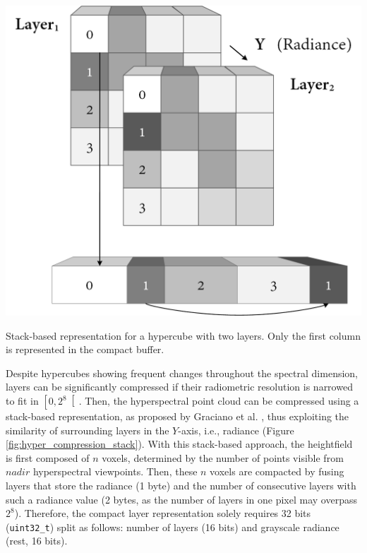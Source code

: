 \begin{marginfigure}[.cm]
    \centering
    \includegraphics[width=\linewidth]{figs/hyper_point_cloud/stack.png}
	\caption{Stack-based representation for a hypercube with two layers. Only the first column is represented in the compact buffer. }
	\label{fig:hyper_compression_stack}
\end{marginfigure}
Despite hypercubes showing frequent changes throughout the spectral dimension, layers can be significantly compressed if their radiometric resolution is narrowed to fit in $\left[0, 2^8\right[$. Then, the hyperspectral point cloud can be compressed using a stack-based representation, as proposed by Graciano et al. \cite{graciano_quadstack_2021}, thus exploiting the similarity of surrounding layers in the $Y$-axis, i.e., radiance (Figure \ref{fig:hyper_compression_stack}). With this stack-based approach, the heightfield is first composed of $n$ voxels, determined by the number of points visible from $\textit{nadir}$ hyperspectral viewpoints. Then, these $n$ voxels are compacted by fusing layers that store the radiance (1 byte) and the number of consecutive layers with such a radiance value (2 bytes, as the number of layers in one pixel may overpass $2^8$). Therefore, the compact layer representation solely requires 32 bits (\verb|uint32_t|) split as follows: number of layers (16 bits) and grayscale radiance (rest, 16 bits).

